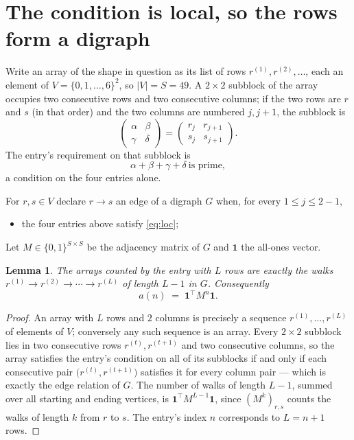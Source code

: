 \documentclass[11pt,a4paper]{article}
\theoremstyle{plain}
\newtheorem{lemma}[theorem]{Lemma}
\theoremstyle{definition}
\begin{document}
\section{The condition is local, so the rows form a digraph}

Write an array of the shape in question as its list of rows
$r^{(1)},r^{(2)},\dots$, each an element of
$V=\{0,1,\dots,6\}^{2}$, so $|V|=S=49$. A $2\times2$ subblock of the array
occupies two consecutive rows and two consecutive columns; if the two rows are $r$
and $s$ (in that order) and the two columns are numbered $j,j+1$,
the subblock is
\[
\begin{pmatrix}\alpha&\beta\\\gamma&\delta\end{pmatrix}=\begin{pmatrix}r_j&r_{j+1}\\s_j&s_{j+1}\end{pmatrix}.
\]
The entry's requirement on that subblock is
\begin{equation}\label{eq:loc}
\alpha+\beta+\gamma+\delta\ \text{is prime},
\end{equation}
a condition on the four entries alone.

For $r,s\in V$ declare $r\to s$ an edge of a digraph $G$ when, for every
$1\le j\le 2-1$,
\begin{itemize}
\item the four entries above satisfy \eqref{eq:loc};

\end{itemize}
Let $M\in\{0,1\}^{S\times S}$ be the adjacency matrix of $G$ and $\mathbf{1}$ the
all-ones vector.

\begin{lemma}\label{lem:walk}
The arrays counted by the entry with $L$ rows are exactly the walks
$r^{(1)}\to r^{(2)}\to\cdots\to r^{(L)}$ of length $L-1$ in $G$. Consequently
\[
a(n)\;=\;\mathbf{1}^{\!\top}M^{n}\mathbf{1} .
\]
\end{lemma}

\begin{proof}
An array with $L$ rows and $2$ columns is precisely a sequence
$r^{(1)},\dots,r^{(L)}$ of elements of $V$; conversely any such sequence is an array.
Every $2\times2$ subblock lies in two consecutive rows $r^{(t)},r^{(t+1)}$ and two
consecutive columns, so the array satisfies the entry's condition on all of its subblocks
if and only if each consecutive pair $\bigl(r^{(t)},r^{(t+1)}\bigr)$ satisfies it for
every column pair --- which is exactly the edge relation of $G$. The number of walks of
length $L-1$, summed over all starting and ending vertices, is
$\mathbf{1}^{\!\top}M^{L-1}\mathbf{1}$, since $(M^{k})_{r,s}$ counts the walks of
length $k$ from $r$ to $s$. The entry's index $n$ corresponds to $L=n+1$ rows.
\end{proof}
\end{document}
